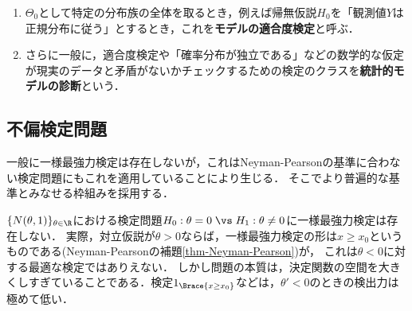 \documentclass[uplatex,dvipdfmx]{jsreport}
\begin{document}
\begin{example}\mbox{}
    \begin{enumerate}
        \item $\Theta_0$として特定の分布族の全体を取るとき，例えば帰無仮説$H_0$を「観測値$Y$は正規分布に従う」とするとき，これを\textbf{モデルの適合度検定}と呼ぶ．
        \item さらに一般に，適合度検定や「確率分布が独立である」などの数学的な仮定が現実のデータと矛盾がないかチェックするための検定のクラスを\textbf{統計的モデルの診断}という．
    \end{enumerate}
\end{example}

\subsection{不偏検定問題}

\begin{tcolorbox}[colframe=ForestGreen, colback=ForestGreen!10!white,breakable,colbacktitle=ForestGreen!40!white,coltitle=black,fonttitle=\bfseries\sffamily,
title=]
    一般に一様最強力検定は存在しないが，これはNeyman-Pearsonの基準に合わない検定問題にもこれを適用していることにより生じる．
    そこでより普遍的な基準とみなせる枠組みを採用する．
\end{tcolorbox}

\begin{example}[一様最強力検定が存在しない形の検定問題]
    $\{N(\theta,1)\}_{\theta\in\R}$における検定問題$H_0:\theta=0\;\vs\;H_1:\theta\ne0$に一様最強力検定は存在しない．
    実際，対立仮説が$\theta>0$ならば，一様最強力検定の形は$x\ge x_0$というものである(Neyman-Pearsonの補題\ref{thm-Neyman-Pearson})が，
    これは$\theta<0$に対する最適な検定ではありえない．
    しかし問題の本質は，決定関数の空間を大きくしすぎていることである．検定$1_{\Brace{x\ge x_0}}$などは，$\theta'<0$のときの検出力は極めて低い．
\end{example}
\end{document}
